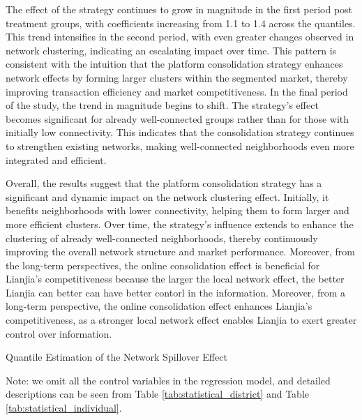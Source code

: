 \documentclass[11pt]{article}
\begin{document}
The effect of the strategy continues to grow in magnitude in the first period post treatment groups, with coefficients increasing from 1.1 to 1.4 across the quantiles. This trend intensifies in the second period, with even greater changes observed in network clustering, indicating an escalating impact over time. This pattern is consistent with the intuition that the platform consolidation strategy enhances network effects by forming larger clusters within the segmented market, thereby improving transaction efficiency and market competitiveness. In the final period of the study, the trend in magnitude begins to shift. The strategy's effect becomes significant for already well-connected groups rather than for those with initially low connectivity. This indicates that the consolidation strategy continues to strengthen existing networks, making well-connected neighborhoods even more integrated and efficient.

Overall, the results suggest that the platform consolidation strategy has a significant and dynamic impact on the network clustering effect. Initially, it benefits neighborhoods with lower connectivity, helping them to form larger and more efficient clusters. Over time, the strategy's influence extends to enhance the clustering of already well-connected neighborhoods, thereby continuously improving the overall network structure and market performance. Moreover, from the long-term perspectives, the online consolidation effect is beneficial for Lianjia's competitiveness because the larger the local network effect, the better Lianjia can better can have better contorl in the information. Moreover, from a long-term perspective, the online consolidation effect enhances Lianjia's competitiveness, as a stronger local network effect enables Lianjia to exert greater control over information.

\begin{table}
  \begin{center}
    \begin{scriptsize}
      \caption{Quantile Estimation of the Network Spillover Effect}
      \label{tab:quantile_estimate_network}
      
    
    Note: we omit all the control variables in the regression model, and detailed descriptions can be seen from Table \ref{tab:statistical_district} and Table \ref{tab:statistical_individual}.
    \end{scriptsize}
  \end{center}
\end{table}
\end{document}
